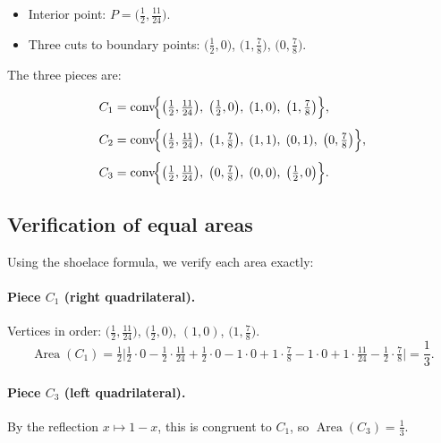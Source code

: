 \documentclass[11pt]{article}
\theoremstyle{definition}
\begin{document}
\begin{itemize}
\item Interior point: $P = \bigl(\tfrac{1}{2}, \tfrac{11}{24}\bigr)$.
\item Three cuts to boundary points:
  $\bigl(\tfrac{1}{2}, 0\bigr)$,
  $\bigl(1, \tfrac{7}{8}\bigr)$,
  $\bigl(0, \tfrac{7}{8}\bigr)$.
\end{itemize}

\medskip
The three pieces are:

\begin{align*}
  C_1 &= \operatorname{conv}\!\Bigl\{
    \bigl(\tfrac{1}{2}, \tfrac{11}{24}\bigr),\;
    \bigl(\tfrac{1}{2}, 0\bigr),\;
    (1, 0),\;
    \bigl(1, \tfrac{7}{8}\bigr)
  \Bigr\},\\[4pt]
  C_2 &= \operatorname{conv}\!\Bigl\{
    \bigl(\tfrac{1}{2}, \tfrac{11}{24}\bigr),\;
    \bigl(1, \tfrac{7}{8}\bigr),\;
    (1,1),\; (0,1),\;
    \bigl(0, \tfrac{7}{8}\bigr)
  \Bigr\},\\[4pt]
  C_3 &= \operatorname{conv}\!\Bigl\{
    \bigl(\tfrac{1}{2}, \tfrac{11}{24}\bigr),\;
    \bigl(0, \tfrac{7}{8}\bigr),\;
    (0,0),\;
    \bigl(\tfrac{1}{2}, 0\bigr)
  \Bigr\}.
\end{align*}

\subsection{Verification of equal areas}

Using the shoelace formula, we verify each area exactly:

\paragraph{Piece $C_1$ (right quadrilateral).}
Vertices in order:
$\bigl(\tfrac{1}{2},\tfrac{11}{24}\bigr)$,
$\bigl(\tfrac{1}{2},0\bigr)$,
$(1,0)$,
$\bigl(1,\tfrac{7}{8}\bigr)$.
\[
  \operatorname{Area}(C_1) = \tfrac{1}{2}\bigl|
    \tfrac{1}{2}\cdot 0 - \tfrac{1}{2}\cdot\tfrac{11}{24}
    + \tfrac{1}{2}\cdot 0 - 1\cdot 0
    + 1\cdot\tfrac{7}{8} - 1\cdot 0
    + 1\cdot\tfrac{11}{24} - \tfrac{1}{2}\cdot\tfrac{7}{8}
  \bigr|
  = \frac{1}{3}.
\]

\paragraph{Piece $C_3$ (left quadrilateral).}
By the reflection $x \mapsto 1-x$, this is congruent to $C_1$, so
$\operatorname{Area}(C_3) = \tfrac{1}{3}$.
\end{document}
